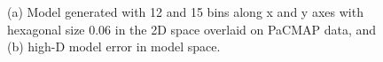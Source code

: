 \documentclass[
  12pt]{article}
\begin{document}
\begin{figure}[H]


\caption{\label{fig-nldervisMNISTPACMAP}(a) Model generated with 12 and
15 bins along x and y axes with hexagonal size 0.06 in the 2D space
overlaid on PaCMAP data, and (b) high-D model error in model space.}

\end{figure}%
\end{document}
